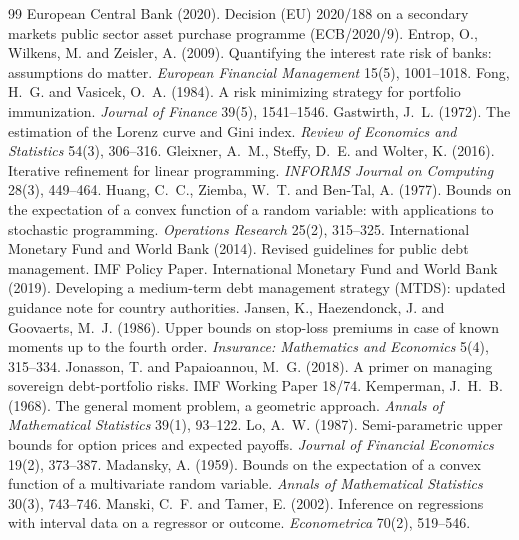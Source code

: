 \documentclass[11pt,a4paper]{article}
\theoremstyle{remark}
\begin{document}
\begin{thebibliography}{99}
 European Central Bank (2020). Decision (EU) 2020/188 on a secondary markets public sector asset purchase programme (ECB/2020/9).
 Entrop, O., Wilkens, M. and Zeisler, A. (2009). Quantifying the interest rate risk of banks: assumptions do matter. \emph{European Financial Management} 15(5), 1001--1018.
 Fong, H.~G. and Vasicek, O.~A. (1984). A risk minimizing strategy for portfolio immunization. \emph{Journal of Finance} 39(5), 1541--1546.
 Gastwirth, J.~L. (1972). The estimation of the Lorenz curve and Gini index. \emph{Review of Economics and Statistics} 54(3), 306--316.
 Gleixner, A.~M., Steffy, D.~E. and Wolter, K. (2016). Iterative refinement for linear programming. \emph{INFORMS Journal on Computing} 28(3), 449--464.
 Huang, C.~C., Ziemba, W.~T. and Ben-Tal, A. (1977). Bounds on the expectation of a convex function of a random variable: with applications to stochastic programming. \emph{Operations Research} 25(2), 315--325.
 International Monetary Fund and World Bank (2014). Revised guidelines for public debt management. IMF Policy Paper.
 International Monetary Fund and World Bank (2019). Developing a medium-term debt management strategy (MTDS): updated guidance note for country authorities.
 Jansen, K., Haezendonck, J. and Goovaerts, M.~J. (1986). Upper bounds on stop-loss premiums in case of known moments up to the fourth order. \emph{Insurance: Mathematics and Economics} 5(4), 315--334.
 Jonasson, T. and Papaioannou, M.~G. (2018). A primer on managing sovereign debt-portfolio risks. IMF Working Paper 18/74.
 Kemperman, J.~H.~B. (1968). The general moment problem, a geometric approach. \emph{Annals of Mathematical Statistics} 39(1), 93--122.
 Lo, A.~W. (1987). Semi-parametric upper bounds for option prices and expected payoffs. \emph{Journal of Financial Economics} 19(2), 373--387.
 Madansky, A. (1959). Bounds on the expectation of a convex function of a multivariate random variable. \emph{Annals of Mathematical Statistics} 30(3), 743--746.
 Manski, C.~F. and Tamer, E. (2002). Inference on regressions with interval data on a regressor or outcome. \emph{Econometrica} 70(2), 519--546.

\end{thebibliography}
\end{document}
